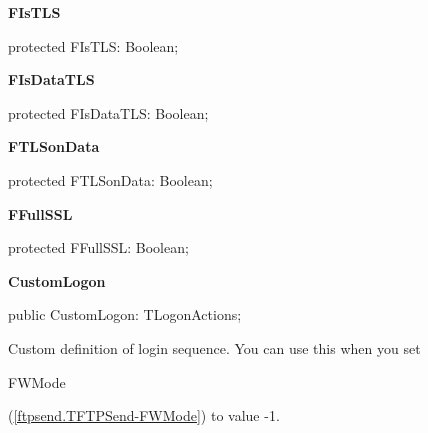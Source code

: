 \documentclass{report}
\newif\ifpdf
\begin{document}
\begin{list}{}
\par  \label{ftpsend.TFTPSend-FIsTLS}
\item[\textbf{FIsTLS}\hfill]
\ifpdf
\begin{flushleft}
\fi
\begin{ttfamily}
protected FIsTLS: Boolean;\end{ttfamily}

\ifpdf
\end{flushleft}
\fi


\par  \label{ftpsend.TFTPSend-FIsDataTLS}
\item[\textbf{FIsDataTLS}\hfill]
\ifpdf
\begin{flushleft}
\fi
\begin{ttfamily}
protected FIsDataTLS: Boolean;\end{ttfamily}

\ifpdf
\end{flushleft}
\fi


\par  \label{ftpsend.TFTPSend-FTLSonData}
\item[\textbf{FTLSonData}\hfill]
\ifpdf
\begin{flushleft}
\fi
\begin{ttfamily}
protected FTLSonData: Boolean;\end{ttfamily}

\ifpdf
\end{flushleft}
\fi


\par  \label{ftpsend.TFTPSend-FFullSSL}
\item[\textbf{FFullSSL}\hfill]
\ifpdf
\begin{flushleft}
\fi
\begin{ttfamily}
protected FFullSSL: Boolean;\end{ttfamily}

\ifpdf
\end{flushleft}
\fi


\par  \label{ftpsend.TFTPSend-CustomLogon}
\item[\textbf{CustomLogon}\hfill]
\ifpdf
\begin{flushleft}
\fi
\begin{ttfamily}
public CustomLogon: TLogonActions;\end{ttfamily}

\ifpdf
\end{flushleft}
\fi


\par Custom definition of login sequence. You can use this when you set \begin{ttfamily}FWMode\end{ttfamily}(\ref{ftpsend.TFTPSend-FWMode}) to value {-}1.\end{list}
\end{document}
